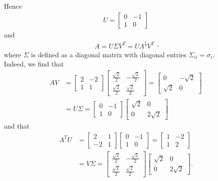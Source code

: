 \documentclass[11pt]{article}
\begin{document}
Hence 
\begin{equation}\begin{split} U = \begin{bmatrix} 0 & -1 \\ 1 & 0\end{bmatrix} \end{split}\nonumber\end{equation} and
\begin{equation}\begin{split} A = U\Sigma V^T = U\Lambda^{\frac12}V^T\end{split},\nonumber\end{equation}
where $\Sigma$ is defined as a diagonal matrix with diagonal entries $\Sigma_{ii} = \sigma_i$.\\[0.3cm]
Indeed, we find that 
\begin{equation}\begin{split} 
AV &= \begin{bmatrix} 2 & -2\\1 & 1\end{bmatrix}\begin{bmatrix} \frac{\sqrt{2}}2 & -\frac{\sqrt{2}}2 \\ \frac{\sqrt{2}}2 & \frac{\sqrt{2}}2 \end{bmatrix} = 
\begin{bmatrix} 0 & -\sqrt{2} \\ \sqrt{2} & 0\end{bmatrix}\\
&= U\Sigma = \begin{bmatrix} 0 & -1\\1 & 0\end{bmatrix}\begin{bmatrix} \sqrt{2} & 0\\0 & 2 \sqrt{2} \end{bmatrix}   
\end{split}\nonumber\end{equation} 
and that
\begin{equation}\begin{split} 
A^TU &= \begin{bmatrix} 2 &1 \\ -2 & 1\end{bmatrix} \begin{bmatrix} 0 & -1\\1 & 0\end{bmatrix} = \begin{bmatrix} 1 & -2\\ 1 & 2\end{bmatrix} \\
&=V\Sigma = \begin{bmatrix} \frac{\sqrt{2}}2 & -\frac{\sqrt{2}}2 \\ \frac{\sqrt{2}}2 & \frac{\sqrt{2}}2 \end{bmatrix} \begin{bmatrix}\sqrt{2} & 0\\0 & 2\sqrt{2}\end{bmatrix}.
\end{split}\nonumber\end{equation} 
\end{document}
